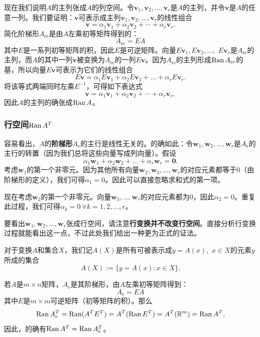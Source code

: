 现在我们说明$A$的主列张成$A$的列空间。令$\mathbf{v}_{1},\mathbf{v}_{2},\ldots,\mathbf{v}_{r}$是$A$的主列，并令$\mathbf{v}$是$A$的任意一列。我们要证明：$\mathbf{v}$可表示成主列$\mathbf{v}_{1},\mathbf{v}_{2},\ldots,\mathbf{v}_{r}$的线性组合\[\mathbf{v}=\alpha_1\mathbf{v}_1+\alpha_2\mathbf{v}_2+\cdots+\alpha_r\mathbf{v}_r.\]
简化阶梯形$A_{\mathrm{re}}$是由$A$左乘初等矩阵得到的：\[A_{\mathrm{re}}=EA\]
其中$E$是一系列初等矩阵的积，因此$E$是可逆矩阵。向量$E\mathbf{v}_{1},E\mathbf{v}_{2},\ldots,$ $E\mathbf{v}_{r}$是$A_{\mathrm{re}}$的主列，而$A$的其中一列$\mathbf{v}$被变换为$A_{\mathrm{re}}$的一列$E\mathbf{v}$。因为$A_{\mathrm{re}}$的主列形成$\operatorname{Ran} A_{\mathrm{re}}$的基，所以向量$E\mathbf{v}$可表示为它们的线性组合\[E\mathbf{v}=\alpha_1E\mathbf{v}_1+\alpha_2E\mathbf{v}_2+\ldots+\alpha_rE\mathbf{v}_r.\]
将该等式两端同时左乘$E^{-1}$，可得如下表达式\[\mathbf{v}=\alpha_1\mathbf{v}_1+\alpha_2\mathbf{v}_2+\cdots+\alpha_r\mathbf{v}_r,\]
因此$A$的主列的确张成$\operatorname{Ran} A$。

\subsubsection{行空间\texorpdfstring{$\operatorname{Ran} A^T$}{Ran A\^{}T}}

容易看出，$A$的\textbf{阶梯形}$A_{\mathrm{e}}$的主行是线性无关的。的确如此：令$\mathbf{w}_1,\mathbf{w}_2,\ldots,\mathbf{w}_r$是$A_{\mathrm{e}}$的主行的转置（因为我们总将这些向量写成列向量）。假设\[\alpha_1\mathbf{w}_1+\alpha_2\mathbf{w}_2+\ldots+\alpha_r\mathbf{w}_r=\mathbf{0}.\]
考虑$\mathbf{w}_1$的第一个非零元。因为其他所有向量$\mathbf{w}_2,\mathbf{w}_3,\ldots,\mathbf{w}_r$的对应元素都等于$0$（由阶梯形的定义），我们可得$\alpha_1=0$。因此可以直接忽略求和式的第一项。

现在考虑$\mathbf{w}_2$的第一个非零元。向量$\mathbf{w}_3,\ldots,\mathbf{w}_r$的对应元素都为$0$，因此$\alpha_2=0$。重复此过程，我们可得$\alpha_{k}=0\ \forall k=1,2,\ldots,r$。

要看出$\mathbf{w}_{1},\mathbf{w}_{2},\ldots,\mathbf{w}_{r}$张成行空间，请注意{\bf 行变换并不改变行空间}。直接分析行变换过程就能看出这一点，不过此处我们给出一种更为正式的证法。

对于变换$A$和集合$X$，我们记$A(X)$是所有可被表示成$y=A(x),$ $x\in X$的元素$y$所成的集合\[A(X):=\{y=A(x):x\in X\}.\]

若$A$是$m\times n$矩阵，$A_{\mathrm{e}}$是其阶梯形，由$A$左乘初等矩阵得到：\[A_{\mathrm{e}}=EA\]
其中$E$是$m\times m$可逆矩阵（初等矩阵的积）。那么\[\operatorname{Ran} A_{\mathrm{e}}^T=\operatorname{Ran} (A^TE^T)=A^T(\operatorname{Ran} E^T)=A^T(\mathbb{R}^m)=\operatorname{Ran} A^T,\]
因此，的确有$\operatorname{Ran} A^T = \operatorname{Ran} A_{\mathrm{e}}^T$。

